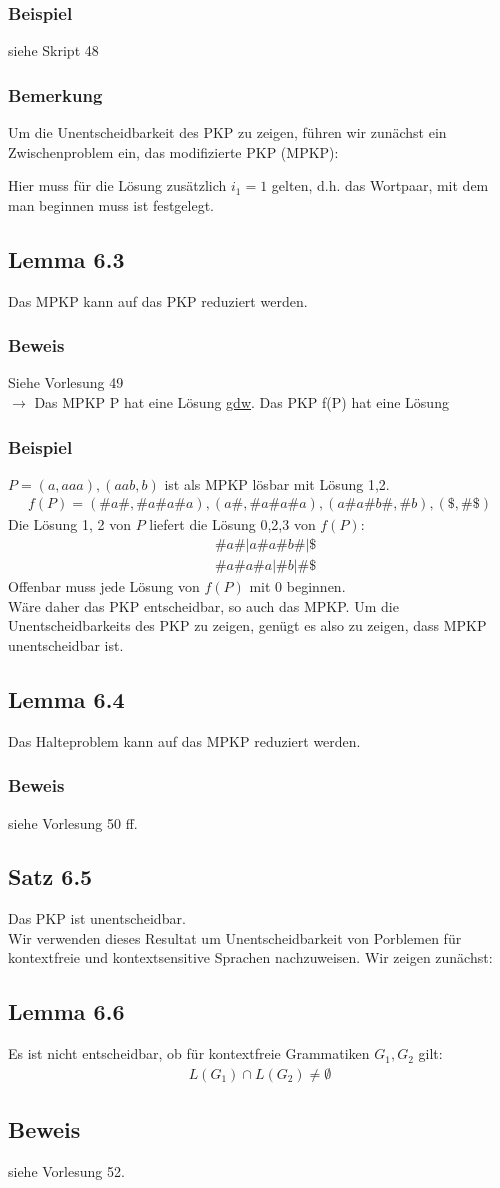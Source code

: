 \subsubsection{Beispiel}
siehe Skript 48
\subsubsection{Bemerkung}
Um die Unentscheidbarkeit des PKP zu zeigen, führen wir zunächst ein Zwischenproblem ein, das modifizierte PKP (MPKP):\par
Hier muss für die Lösung zusätzlich $i_1 = 1$ gelten, d.h. das Wortpaar, mit dem man beginnen muss ist festgelegt.
\subsection{Lemma 6.3}
Das MPKP kann auf das PKP reduziert werden.
\subsubsection{Beweis}
Siehe Vorlesung 49\\
$\to$ Das MPKP P hat eine Lösung \underline{gdw}. Das PKP f(P) hat eine Lösung
\subsubsection{Beispiel}
$P = (a, aaa),(aab,b)$ ist als MPKP lösbar mit Lösung 1,2.
\begin{align*}
	f(P) = (\#a\#,\#a\#a\#a),(a\#,\#a\#a\#a),(a\#a\#b\#, \#b), (\$,\#\$)
\end{align*}
Die Lösung 1, 2 von $P$ liefert die Lösung 0,2,3 von $f(P)$:
\begin{align*}
	&\#a\#|a\#a\#b\#|\$\\
	&\#a\#a\#a|\#b|\#\$
\end{align*}
Offenbar muss jede Lösung von $f(P) $ mit 0 beginnen.\\
Wäre daher das PKP entscheidbar, so auch das MPKP. Um die Unentscheidbarkeits des PKP zu zeigen, genügt es also zu zeigen, dass MPKP unentscheidbar ist.
\subsection{Lemma 6.4}
Das Halteproblem kann auf das MPKP reduziert werden.
\subsubsection{Beweis}
siehe Vorlesung 50 ff.
\subsection{Satz 6.5}
Das PKP ist unentscheidbar.\\
Wir verwenden dieses Resultat um Unentscheidbarkeit von Porblemen für kontextfreie und kontextsensitive Sprachen nachzuweisen. Wir zeigen zunächst:
\subsection{Lemma 6.6}
Es ist nicht entscheidbar, ob für kontextfreie Grammatiken $G_1, G_2$ gilt:
\begin{align*}
	L(G_1)\cap L(G_2) \not = \emptyset
\end{align*}
\subsection{Beweis}
siehe Vorlesung 52.

